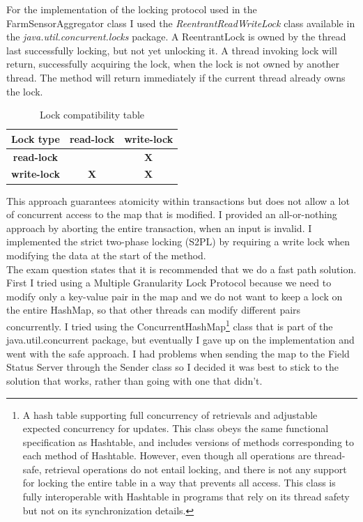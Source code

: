 \documentclass{article}      %
\begin{document}
For the implementation of the locking protocol used in the FarmSensorAggregator class I used the \emph{ReentrantReadWriteLock} class available in the \emph{java.util.concurrent.locks} package. A ReentrantLock is owned by the thread last successfully locking, but not yet unlocking it. A thread invoking lock will return, successfully acquiring the lock, when the lock is not owned by another thread. The method will return immediately if the current thread already owns the lock. 
\begin{table}[h]
\begin{center}
\begin{tabular}{|c|c|c|}
\hline
{\bf{Lock type}} & \bf{read-lock} & \bf{write-lock} \\ \hline
\bf{read-lock} & \multicolumn{1}{l|}{} & \bf{X} \\ \hline
\bf{write-lock} & \bf{X} & \bf{X} \\ \hline
\end{tabular}
\caption{Lock compatibility table}
\label{Lock compatibility table}
\end{center}
\end{table}
This approach guarantees atomicity within transactions but does not allow a lot of concurrent access to the map that is modified. I provided an all-or-nothing approach by aborting the entire transaction, when an input is invalid. I implemented the strict two-phase locking (S2PL) by requiring a write lock when modifying the data at the start of the method. \\

The exam question states that it is recommended that we do a fast path solution. First I tried using a Multiple Granularity Lock Protocol because we need to modify only a key-value pair in the map and we do not want to keep a lock on the entire HashMap, so that other threads can modify different pairs concurrently. I tried using the ConcurrentHashMap\footnote{A hash table supporting full concurrency of retrievals and adjustable expected concurrency for updates. This class obeys the same functional specification as Hashtable, and includes versions of methods corresponding to each method of Hashtable. However, even though all operations are thread-safe, retrieval operations do not entail locking, and there is not any support for locking the entire table in a way that prevents all access. This class is fully interoperable with Hashtable in programs that rely on its thread safety but not on its synchronization details.} class that is part of the java.util.concurrent package, but eventually I gave up on the implementation and went with the safe approach. I had problems when sending the map to the Field Status Server through the Sender class so I decided it was best to stick to the solution that works, rather than going with one that didn't.\\
\end{document}
